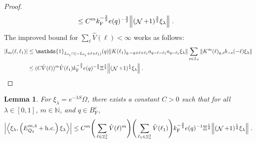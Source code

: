 \documentclass[12pt,a4paper]{article}
\numberwithin{equation}{section}
\newcommand{\NNN}{\mathbb{N}}
\newcommand{\1}{\mathbb{I}}
\newcommand{\F}{\mathrm{F}}
\newcommand{\I}{\mathrm{I}}
\DeclareMathOperator{\Z}{\mathbb{Z}}
\DeclareMathOperator{\NN}{\mathcal{N}}
\newcommand{\half}{\frac{1}{2}}
\newcommand{\eva}[1]{\left\langle #1 \right\rangle}
\theoremstyle{plain}
\newtheorem{lemma}[theorem]{Lemma}
\theoremstyle{definition}
\theoremstyle{remark}
\theoremstyle{plain}
\theoremstyle{definition}
\theoremstyle{remark}
\begin{document}
\begin{proof}
{\begin{align}
	&\leq C^m k_{\F}^{-\frac 32} e(q)^{-\frac 32}
		\norm{(\NN+1)^{\frac 32} \xi_\lambda} \;. \label{eq:estEQ2153_Coulomb}
\end{align}
The improved bound for $ \sum_\ell \hat{V}(\ell) < \infty $ works as follows:}
\begin{align}
	|\I_m(\ell, \ell_1)|
	&\leq \mathds{1}_{L_{\ell_1} \cap (-L_{\ell_1} + \ell + \ell_1)}(q) \norm{K(\ell_1)_{q,-q+\ell+\ell_1} a_{q-\ell-\ell_1} a_{q-\ell_1} \xi_\lambda}
		\sum\limits_{ s \in L_{\ell}}
		\norm{ K^m(\ell)_{q,s} b_{-s}(-\ell) \xi_\lambda }\nonumber\\
	&\leq (C \hat{V}(\ell))^m
		\hat{V}(\ell_1)
		k_{\F}^{-\frac 32} e(q)^{-\frac 32} \Xi^\half
		\norm{(\NN+1)^\half\xi_\lambda} \;. \label{eq:estEQ2153}
\end{align}
\end{proof}


\begin{lemma} \label{lem:EQ217}
For $\xi_\lambda = e^{-\lambda S} \Omega$, there exists a constant $ C > 0 $ such that for all $ \lambda \in [0,1] $, $ m \in \NNN $, and $ q \in B_{\F}^c $,
\begin{align}
	\abs{\eva{\xi_\lambda,\left(E^{m,4}_{Q_2}+\mathrm{h.c.}\right) \xi_\lambda }}
	\leq C^m \Bigg(\sum\limits_{\ell\in \Z^3_*} \hat{V}(\ell)^m \Bigg)
		\Bigg(\sum\limits_{\ell_1\in \Z^3_*} \hat{V}(\ell_1) \Bigg)
		k_{\F}^{-\frac{3}{2}} e(q)^{-1} \Xi^{\half} 
		\norm{(\NN+1)^\half \xi_\lambda } \;. \label{eq:estEQ217}
\end{align}
\end{lemma}
\end{document}
